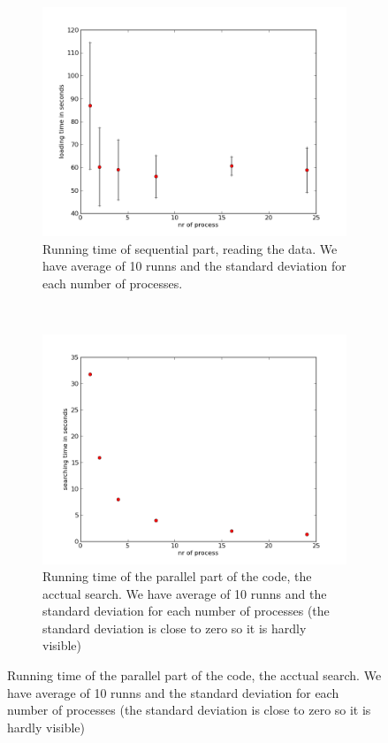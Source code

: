 \documentclass[a4paper,10pt]{article}
\begin{document}
\begin{figure}[h!]
        \centering
        \begin{subfigure}[b]{0.70\textwidth}
                \centering
                \includegraphics[width=\textwidth]{graphics/openmp17gb/load_time.png}
                \caption{Running time of sequential part, reading the data. 
                         We have average of 10 runns and the standard deviation for each number
                         of processes.}
                \label{fig:openmp_load}
        \end{subfigure}%
        \\
        \begin{subfigure}[b]{0.70\textwidth}
                \centering
                \includegraphics[width=\textwidth]{graphics/openmp17gb/search_time.png}
                \caption{Running time of the parallel part of the code, the acctual search. 
                         We have average of 10 runns and the standard deviation for each number
                         of processes (the standard deviation is close to zero so it is hardly 
                         visible)}
                \label{fig:openmp_search}
        \end{subfigure}
\end{figure}
\end{document}
